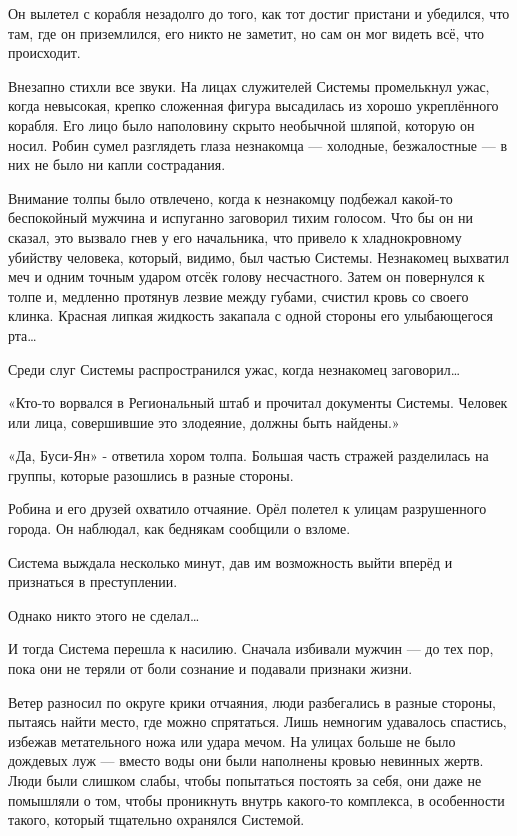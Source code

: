 \documentclass[a4paper,12pt]{book}
\begin{document}
\par
Он вылетел с корабля незадолго до того, как тот достиг пристани и убедился, что там, где он приземлился, его никто не заметит, но сам он мог видеть всё, что происходит.\\
\par
Внезапно стихли все звуки. На лицах служителей Системы промелькнул ужас, когда невысокая, крепко сложенная фигура высадилась из хорошо укреплённого корабля. Его лицо было наполовину скрыто необычной шляпой, которую он носил. Робин сумел разглядеть глаза незнакомца — холодные, безжалостные — в них не было ни капли сострадания.
\par
Внимание толпы было отвлечено, когда к незнакомцу подбежал какой-то беспокойный мужчина и испуганно заговорил тихим голосом. Что бы он ни сказал, это вызвало гнев у его начальника, что привело к хладнокровному убийству человека, который, видимо, был частью Системы. Незнакомец выхватил меч и одним точным ударом отсёк голову несчастного. Затем он повернулся к толпе и, медленно протянув лезвие между губами, счистил кровь со своего клинка. Красная липкая жидкость закапала с одной стороны его улыбающегося рта…
\par
Среди слуг Системы распространился ужас, когда незнакомец заговорил…
\par
«Кто-то ворвался в Региональный штаб и прочитал документы Системы. Человек или лица, совершившие это злодеяние, должны быть найдены.»
\par
«Да, Буси-Ян» - ответила хором толпа. Большая часть стражей разделилась на группы, которые разошлись в разные стороны.
\par
Робина и его друзей охватило отчаяние. Орёл полетел к улицам разрушенного города. Он наблюдал, как беднякам сообщили о взломе.
\par
Система выждала несколько минут, дав им возможность выйти вперёд и признаться в преступлении.
\par
Однако никто этого не сделал…
\par
И тогда Система перешла к насилию. Сначала избивали мужчин — до тех пор, пока они не теряли от боли сознание и подавали признаки жизни.
\par
Ветер разносил по округе крики отчаяния, люди разбегались в разные стороны, пытаясь найти место, где можно спрятаться. Лишь немногим удавалось спастись, избежав метательного ножа или удара мечом. На улицах больше не было дождевых луж — вместо воды они были наполнены кровью невинных жертв. Люди были слишком слабы, чтобы попытаться постоять за себя, они даже не помышляли о том, чтобы проникнуть внутрь какого-то комплекса, в особенности такого, который тщательно охранялся Системой.\\
\end{document}
